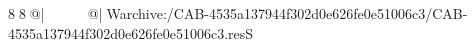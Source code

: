 8  8  @|                                                   @| W   archive:/CAB-4535a137944f302d0e626fe0e51006c3/CAB-4535a137944f302d0e626fe0e51006c3.resS 